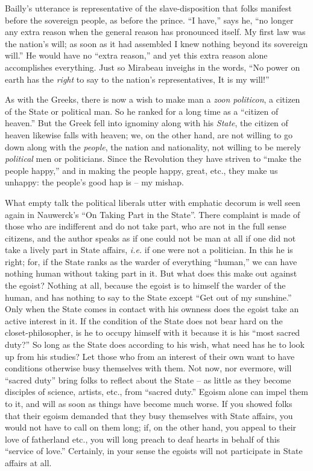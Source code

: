 \documentclass[12pt,a4paper]{book}
\begin{document}
Bailly's utterance is representative of the slave-disposition that folks 
manifest before the sovereign people, as before the prince. ``I have,'' says 
he, ``no longer any extra reason when the general reason has pronounced 
itself. My first law was the nation's will; as soon as it had assembled I knew 
nothing beyond its sovereign will.'' He would have no ``extra reason,'' and 
yet this extra reason alone accomplishes everything. Just so Mirabeau inveighs 
in the words, ``No power on earth has the \textit{right} to say to the 
nation's representatives, It is my will!''

As with the Greeks, there is now a wish to make man a \textit{zoon politicon}, 
a citizen of the State or political man. So he ranked for a long time as a 
``citizen of heaven.'' But the Greek fell into ignominy along with his 
\textit{State}, the citizen of heaven likewise falls with heaven; we, on the 
other hand, are not willing to go down along with the \textit{people}, the 
nation and nationality, not willing to be merely \textit{political} men or 
politicians. Since the Revolution they have striven to ``make the people 
happy,'' and in making the people happy, great, etc., they make us unhappy: 
the people's good hap is -- my mishap.

What empty talk the political liberals utter with emphatic decorum is well 
seen again in Nauwerck's ``On Taking Part in the State''. There complaint is 
made of those who are indifferent and do not take part, who are not in the 
full sense citizens, and the author speaks as if one could not be man at all 
if one did not take a lively part in State affairs, \textit{i.e.} if one were 
not a politician. In this he is right; for, if the State ranks as the warder 
of everything ``human,'' we can have nothing human without taking part in 
it. But what does this make out against the egoist? Nothing at all, because 
the egoist is to himself the warder of the human, and has nothing to say to 
the State except ``Get out of my sunshine.'' Only when the State comes in 
contact with his ownness does the egoist take an active interest in it. If the 
condition of the State does not bear hard on the closet-philosopher, is he to 
occupy himself with it because it is his ``most sacred duty?'' So long as 
the State does according to his wish, what need has he to look up from his 
studies? Let those who from an interest of their own want to have conditions 
otherwise busy themselves with them. Not now, nor evermore, will ``sacred 
duty'' bring folks to reflect about the State -- as little as they become 
disciples of science, artists, etc., from ``sacred duty.'' Egoism alone can 
impel them to it, and will as soon as things have become much worse. If you 
showed folks that their egoism demanded that they busy themselves with State 
affairs, you would not have to call on them long; if, on the other hand, you 
appeal to their love of fatherland etc., you will long preach to deaf hearts 
in behalf of this ``service of love.'' Certainly, in your sense the egoists 
will not participate in State affairs at all.
\end{document}
